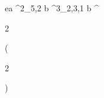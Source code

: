 \begin{eqcode}{e}{a }{^2_{5,2}}{}
  b \in {}^3_{2,3,1} \lend
  b \gets \genar \limits ^ {  \begin{tmatrix} %
  2  \lend
  \end{tmatrix} }( \begin{tmatrix}
  2  \lend
  \end{tmatrix})  \lend
\end{eqcode}
